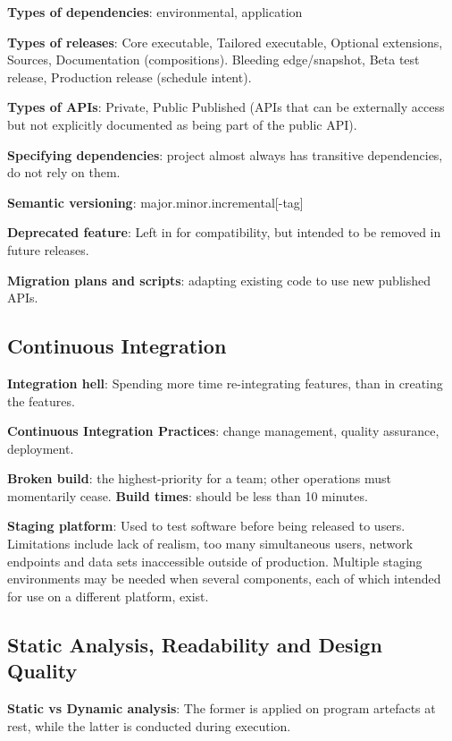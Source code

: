 \documentclass{article}
\begin{document}
\noindent \textbf{Types of dependencies}: environmental, application

\noindent \textbf{Types of releases}: Core executable, Tailored executable, Optional extensions, Sources, Documentation (compositions). 
Bleeding edge/snapshot, Beta test release, Production release (schedule intent).

\noindent \textbf{Types of APIs}: Private, Public
Published (APIs that can be externally access but not explicitly documented as being part of the public API).

\noindent \textbf{Specifying dependencies}: project almost always has transitive dependencies, do not rely on them.

\noindent \textbf{Semantic versioning}: major.minor.incremental[-tag]

\noindent \textbf{Deprecated feature}: Left in for compatibility, but intended to be removed in future releases.

\noindent \textbf{Migration plans and scripts}: adapting existing code to use new published APIs.


\subsection*{Continuous Integration}

\noindent \textbf{Integration hell}: Spending more time re-integrating features, than in creating the features.

\noindent \textbf{Continuous Integration Practices}: change management, quality assurance, deployment.

\noindent \textbf{Broken build}: the highest-priority for a team; other operations must momentarily cease.
\noindent \textbf{Build times}: should be less than 10 minutes.

\noindent \textbf{Staging platform}: Used to test software before being released to users.
Limitations include lack of realism, too many simultaneous users, network endpoints and data sets inaccessible outside of production. 
Multiple staging environments may be needed when several components, each of which intended for use on a different platform, exist.


\subsection*{Static Analysis, Readability and Design Quality}

\noindent \textbf{Static vs Dynamic analysis}: The former is applied on program artefacts at rest, while the latter is conducted during execution.
\end{document}

